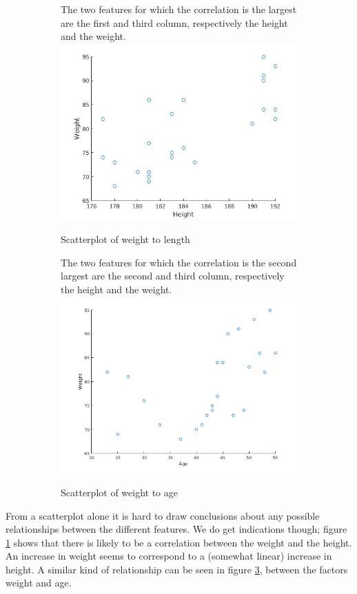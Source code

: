 \documentclass{article}
\begin{document}
\begin{figure}[H]
\centering

\begin{subfigure}[b]{.45\linewidth}
The two features for which the correlation is the largest are the first and third column, respectively the height and the weight.
\centering
\includegraphics[width=\columnwidth]{plot_1_3_a.jpg}
\caption{Scatterplot of weight to length}
\label{fig1.3a}
\end{subfigure}%
\quad
\begin{subfigure}[b]{.45\linewidth}
The two features for which the correlation is the second largest are the second and third column, respectively the height and the weight.
\centering
\includegraphics[width=\linewidth]{plot_1_3_b.png}
\caption{Scatterplot of weight to age}
\label{fig1.3b}
\end{subfigure}
\caption{}
\end{figure}
From a scatterplot alone it is hard to draw conclusions about any possible relationships between the different features. 
We do get indications though; figure \ref{fig1.3a} shows that there is likely to be a correlation between the weight and the height.
An increase in weight seems to correspond to a (somewhat linear) increase in height. 
A similar kind of relationship can be seen in figure \ref{fig1.3b}, between the factors weight and age.
\end{document}
